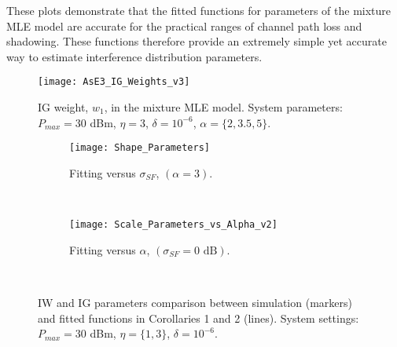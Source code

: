 \documentclass[12pt, draftclsnofoot, onecolumn]{IEEEtran}
\theoremstyle{plain}
\begin{document}
These plots demonstrate that the fitted functions for parameters of the mixture {MLE model} %
are accurate for the practical ranges of {channel} path loss and shadowing. 
These functions therefore provide an extremely simple yet accurate way to estimate interference distribution parameters.
%
%
\iffalse
\begin{figure}[t]%
        \centering
        \texttt{[image: AsE3\_IG\_Weights\_v3]}
        \vspace{-0.25in}
        \caption{IG weight, $w_1$, in the mixture MLE model. System parameters: $P_{max}=30$ dBm, $\eta=3$, $\delta=10^{-6}$, $\alpha=\{2, 3.5, 5\}$.} 
        \label{IGwAE13}
        \vspace{-.45in}
\end{figure}%
\begin{figure*}[t!]%
    \centering
    \begin{subfigure}[t]{0.45\textwidth}
        \centering
        \texttt{[image: Shape\_Parameters]}
        \vspace{-0.16in}
        \caption{{\small {Fitting versus $\sigma_{SF}$, $(\alpha=3)$.}}} %
        \label{IWsAEa}
    \end{subfigure}%
    ~ 
    \begin{subfigure}[t]{0.45\textwidth}
        \centering
        \texttt{[image: Scale\_Parameters\_vs\_Alpha\_v2]}%
        \vspace{-0.16in}
        \caption{{\small {Fitting versus $\alpha$, $(\sigma_{SF}=0 \text{ dB})$.}}}%
        \label{IWsAEb}
    \end{subfigure}\vspace{-0.4in}\\
    \caption{{IW and IG parameters comparison between simulation (markers) and fitted functions in Corollaries 1 and 2 (lines).  System settings: $P_{max}=30$ dBm, $\eta=\{1, 3\}$, $\delta=10^{-6}$.}} \label{IWsAE}
    \vspace{-0.48in}
    \vspace{-.15in}
\end{figure*}
\end{document}

